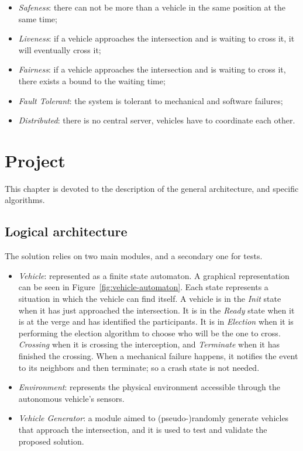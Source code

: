 \documentclass{memoir}
\begin{document}
\begin{itemize}
	\item \emph{Safeness}: there can not be more than a vehicle in the same position at the same time;
	\item \emph{Liveness}: if a vehicle approaches the intersection and is waiting to cross it, it will eventually cross it;
	\item \emph{Fairness}: if a vehicle approaches the intersection and is waiting to cross it, there exists a bound to the waiting time;
	\item \emph{Fault Tolerant}: the system is tolerant to mechanical and software failures;
	\item \emph{Distributed}: there is no central server, vehicles have to coordinate each other.
\end{itemize}



\chapter{Project}\label{ch:project}
This chapter is devoted to the description of the general architecture, and specific algorithms.

\section{Logical architecture}
The solution relies on two main modules, and a secondary one for tests.

\begin{itemize}
	\item \emph{Vehicle}: represented as a finite state automaton. A graphical representation can be seen in Figure~\ref{fig:vehicle-automaton}. Each state represents a situation in which the vehicle can find itself. A vehicle is in the \emph{Init} state when it has just approached the intersection. It is in the \emph{Ready} state when it is at the verge and has identified the participants. It is in \emph{Election} when it is performing the election algorithm to choose who will be the one to cross. \emph{Crossing} when it is crossing the interception, and \emph{Terminate} when it has finished the crossing. When a mechanical failure happens, it notifies the event to its neighbors and then terminate; so a crash state is not needed.
	\item \emph{Environment}: represents the physical environment accessible through the autonomous vehicle's sensors.
	\item \emph{Vehicle Generator}: a module aimed to (pseudo-)randomly generate vehicles that approach the intersection, and it is used to test and validate the proposed solution.
\end{itemize}
\end{document}
